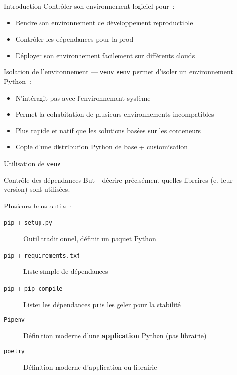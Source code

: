 \begin{frame}{Introduction}
  Contrôler son environnement logiciel pour~:
  \begin{itemize}
    \item Rendre son environnement de développement reproductible
    \item Contrôler les dépendances pour la prod
    \item Déployer son environnement facilement sur différents clouds
  \end{itemize}
\end{frame}

\begin{frame}{Isolation de l'environnement --- \texttt{venv}}
  \texttt{venv} permet d'isoler un environnement Python~:
  \begin{itemize}
    \item N'intéragit pas avec l'environnement système
    \item Permet la cohabitation de plusieurs environnements incompatibles
    \item Plus rapide et natif que les solutions basées sur les conteneurs
    \item Copie d'une distribution Python de base + customisation
  \end{itemize}
\end{frame}

\begin{frame}{Utilisation de \texttt{venv}}
\end{frame}

\begin{frame}{Contrôle des dépendances}
  But~: décrire précisément quelles libraires (et leur version) sont utilisées.

  Plusieurs bons outils~:

  \begin{description}
    \item[\texttt{pip} + \texttt{setup.py}] Outil traditionnel, définit un paquet Python
    \item[\texttt{pip} + \texttt{requirements.txt}] Liste simple de dépendances
    \item[\texttt{pip} + \texttt{pip-compile}] Lister les dépendances puis les geler pour la stabilité
    \item[\texttt{Pipenv}] Définition moderne d'une \textbf{application} Python (pas librairie)
    \item[\texttt{poetry}] Définition moderne d'application ou librairie
  \end{description}
\end{frame}

